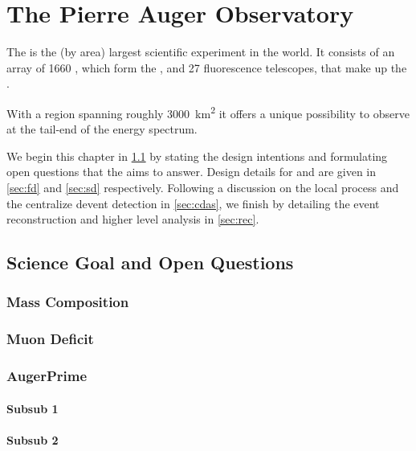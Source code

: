 
\chapter{The Pierre Auger Observatory}
\label{chap:pierre-auger-observatory}

The \PAO is the (by area) largest scientific experiment in the world. It 
consists of an array of 1660 \WCDs, which form the \SD, and 27 fluorescence 
telescopes, that make up the \FD.

With a region spanning roughly \SI{3000}{\kilo\meter\squared} it offers a unique
possibility to observe \UHECRs at the tail-end of the \CR energy spectrum. 

We begin this chapter in \cref{sec:science-case} by stating the design 
intentions and formulating open questions that the \PAO aims to answer. Design
details for \FD and \SD are given in \cref{sec:fd} and \cref{sec:sd} 
respectively. Following a discussion on the local \DAQ process and the 
centralize devent detection in \cref{sec:cdas}, we finish by detailing the event
reconstruction and higher level analysis in \cref{sec:rec}.


\section{Science Goal and Open Questions}
\label{sec:science-case}

\blindtext

\subsection{Mass Composition}

\blindtext
\subsection{Muon Deficit}

\blindtext
\subsection{AugerPrime}

\blindtext

\subsubsection{Subsub 1}
\blindtext

\subsubsection{Subsub 2}
\blindtext




